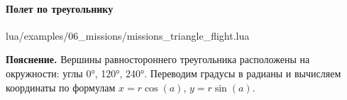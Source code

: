 \paragraph{Полет по треугольнику}
\begin{codefile}{lua/examples/06_missions/missions_triangle_flight.lua}
\end{codefile}
\textbf{Пояснение.} Вершины равностороннего треугольника расположены на окружности: углы 0°, 120°, 240°. Переводим градусы в радианы и вычисляем координаты по формулам \(x = r \cos(a)\), \(y = r \sin(a)\).

